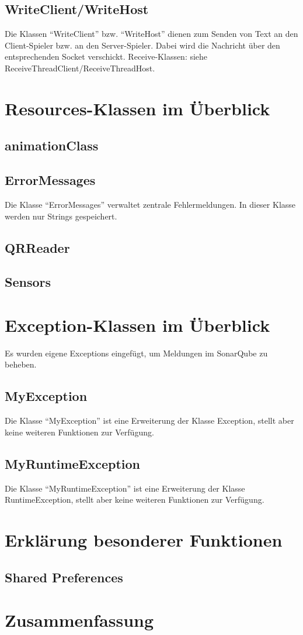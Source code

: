 \documentclass[11pt]{article} %
\begin{document}
\subsection{WriteClient/WriteHost}
Die Klassen \enquote{WriteClient} bzw. \enquote{WriteHost} dienen zum Senden von Text an den Client-Spieler bzw. an den Server-Spieler. Dabei wird die Nachricht über den entsprechenden Socket verschickt. Receive-Klassen: siehe ReceiveThreadClient/ReceiveThreadHost.

\section{Resources-Klassen im Überblick}

\subsection{animationClass}

\subsection{ErrorMessages}
Die Klasse \enquote{ErrorMessages} verwaltet zentrale Fehlermeldungen. In dieser Klasse werden nur Strings gespeichert.

\subsection{QRReader}

\subsection{Sensors}

\section{Exception-Klassen im Überblick}
Es wurden eigene Exceptions eingefügt, um Meldungen  im SonarQube zu beheben.

\subsection{MyException}
Die Klasse \enquote{MyException} ist eine Erweiterung der Klasse Exception, stellt aber keine weiteren Funktionen zur Verfügung.

\subsection{MyRuntimeException}
Die Klasse \enquote{MyRuntimeException} ist eine Erweiterung der Klasse RuntimeException, stellt aber keine weiteren Funktionen zur Verfügung.

\section{Erklärung besonderer Funktionen}

\subsection{Shared Preferences}

\section{Zusammenfassung}
\end{document}
